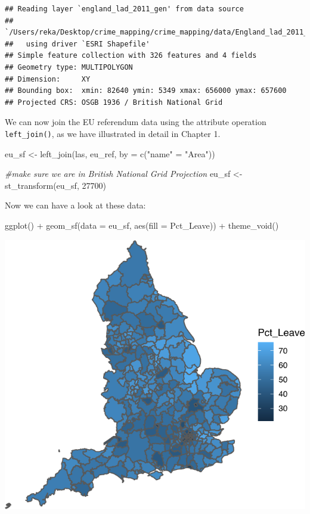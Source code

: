 \documentclass[
  krantz2]{krantz}
\makeatletter
\newenvironment{Shaded}{\begin{snugshade}}{\end{snugshade}}
\newcommand{\AttributeTok}[1]{\textcolor[rgb]{0.61,0.61,0.61}{#1}}
\newcommand{\CommentTok}[1]{\textcolor[rgb]{0.37,0.37,0.37}{\textit{#1}}}
\newcommand{\DecValTok}[1]{\textcolor[rgb]{0.06,0.06,0.06}{#1}}
\newcommand{\FunctionTok}[1]{\textcolor[rgb]{0,0,0}{#1}}
\newcommand{\NormalTok}[1]{#1}
\newcommand{\OtherTok}[1]{\textcolor[rgb]{0.37,0.37,0.37}{#1}}
\newcommand{\SpecialCharTok}[1]{\textcolor[rgb]{0,0,0}{#1}}
\newcommand{\StringTok}[1]{\textcolor[rgb]{0.5,0.5,0.5}{#1}}
\newenvironment{kframe}{%
\medskip{}
\setlength{\fboxsep}{.8em}
 \def\at@end@of@kframe{}%
 \ifinner\ifhmode%
  \def\at@end@of@kframe{\end{minipage}}%
  \begin{minipage}{\columnwidth}%
 \fi\fi%
 \def\FrameCommand##1{\hskip\@totalleftmargin \hskip-\fboxsep
 \colorbox{shadecolor}{##1}\hskip-\fboxsep
     \hskip-\linewidth \hskip-\@totalleftmargin \hskip\columnwidth}%
 \MakeFramed {\advance\hsize-\width
   \@totalleftmargin\z@ \linewidth\hsize
   \@setminipage}}%
 {\par\unskip\endMakeFramed%
 \at@end@of@kframe}
\renewenvironment{Shaded}{\begin{kframe}}{\end{kframe}}
\makeatother
\begin{document}
\begin{verbatim}
## Reading layer `england_lad_2011_gen' from data source 
##   `/Users/reka/Desktop/crime_mapping/crime_mapping/data/England_lad_2011_gen/england_lad_2011_gen.shp' 
##   using driver `ESRI Shapefile'
## Simple feature collection with 326 features and 4 fields
## Geometry type: MULTIPOLYGON
## Dimension:     XY
## Bounding box:  xmin: 82640 ymin: 5349 xmax: 656000 ymax: 657600
## Projected CRS: OSGB 1936 / British National Grid
\end{verbatim}

We can now join the EU referendum data using the attribute operation \texttt{left\_join()}, as we have illustrated in detail in Chapter 1.

\begin{Shaded}
\begin{Highlighting}[]
\NormalTok{eu\_sf }\OtherTok{\textless{}{-}} \FunctionTok{left\_join}\NormalTok{(las, eu\_ref, }\AttributeTok{by =} \FunctionTok{c}\NormalTok{(}\StringTok{"name"} \OtherTok{=} \StringTok{"Area"}\NormalTok{))}

\CommentTok{\#make sure we are in British National Grid Projection}
\NormalTok{eu\_sf }\OtherTok{\textless{}{-}} \FunctionTok{st\_transform}\NormalTok{(eu\_sf, }\DecValTok{27700}\NormalTok{)}
\end{Highlighting}
\end{Shaded}

Now we can have a look at these data:

\begin{Shaded}
\begin{Highlighting}[]
\FunctionTok{ggplot}\NormalTok{() }\SpecialCharTok{+}
  \FunctionTok{geom\_sf}\NormalTok{(}\AttributeTok{data =}\NormalTok{ eu\_sf, }\FunctionTok{aes}\NormalTok{(}\AttributeTok{fill =}\NormalTok{ Pct\_Leave)) }\SpecialCharTok{+} 
  \FunctionTok{theme\_void}\NormalTok{()}
\end{Highlighting}
\end{Shaded}

\includegraphics{crime_mapping_files/figure-latex/unnamed-chunk-134-1.pdf}
\end{document}
